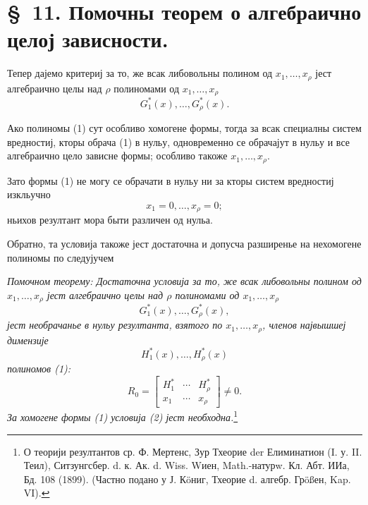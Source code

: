﻿\documentclass[11pt]{article}
\begin{document}
\section*{\S\ 11. Помочны теорем о алгебраично целој зависности.}

Тепер дајемо критериј за то, же всак либовольны полином од $x_1,\ldots,x_\rho$ јест алгебраично целы над $\rho$ полиномами од $x_1,\ldots,x_\rho$
\begin{equation}
  G_1^*(x),\ldots,G_\rho^*(x).
\tag{1}
\end{equation}

Ако полиномы (1) сут особливо хомогене формы, тогда за всак специалны систем вредностиј, кторы обрача (1) в нульу, одновременно се обрачајут в нульу и все алгебраично цело зависне формы; особливо такоже $x_1,\ldots,x_\rho$.

Зато формы (1) не могу се обрачати в нульу ни за кторы систем вредностиј изкльучно
\[
  x_1=0,\ldots,x_\rho=0;
\]
ньихов резултант мора быти различен од нульа.

Обратно, та условија такоже јест достаточна и допусча разширенье на нехомогене полиномы по следујучем

{\itshape Помочном теорему: Достаточна условија за то, же всак либовольны полином од $x_1,\ldots,x_\rho$ јест алгебраично целы над $\rho$ полиномами од $x_1,\ldots,x_\rho$}
\[
  G_1^*(x),\ldots,G_\rho^*(x),
\]
{\itshape јест необрачанье в нульу резултанта, взятого по $x_1,\ldots,x_\rho$, членов највышшеј димензије}
\[
  H_1^*(x),\ldots,H_\rho^*(x)
\]
{\itshape полиномов (1):}
\begin{equation}
  R_0=\left[
  \begin{array}{ccc}
    H_1^*&\cdots&H_\rho^*\\
    x_1&\cdots&x_\rho
  \end{array}
  \right]\ne0.
\tag{2}
\end{equation}
{\itshape За хомогене формы (1) условија (2) јест необходна.}\footnote{О теорији резултантов ср. Ф. Мертенс, Зур Тхеорие der Елиминатион (I. у. II. Теил), Ситзунгсбер. d. к. Ак. d. Wiss. Wиен, Math.-натурw. Кл. Абт. ИИа, Бд. 108 (1899). (Частно подано у Ј. Кöниг, Тхеорие d. алгебр. Грößен, Kap. VI).}
\end{document}
